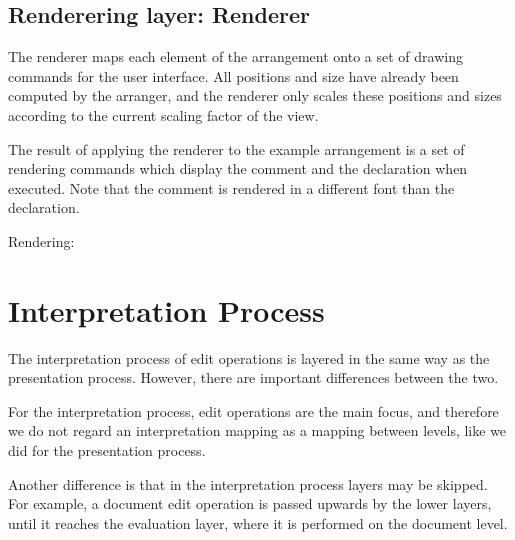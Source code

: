 %																
\subsection{Renderering layer: Renderer} \label{sect:renderer}

The renderer maps each element of the arrangement onto a set of drawing commands for the user interface. All positions and size have already been computed by the arranger, and the renderer only scales these positions and sizes according to the current scaling factor of the view.


 The result of applying the renderer to the example arrangement is a set of rendering commands which display the comment and the declaration when executed. Note that the comment is rendered in a different font than the declaration. 

Rendering:



%																
%																
%																
\section{Interpretation Process}

The interpretation process of edit operations is layered in the same way as the presentation process. However, there are important differences between the two.

For the interpretation process, edit operations are the main focus, and therefore we do not regard an interpretation mapping as a mapping between levels, like we did for the presentation process.

Another difference is that in the interpretation process layers may be skipped. For example, a document edit operation is passed upwards by the lower layers, until it reaches the evaluation layer, where it is performed on the document level.


